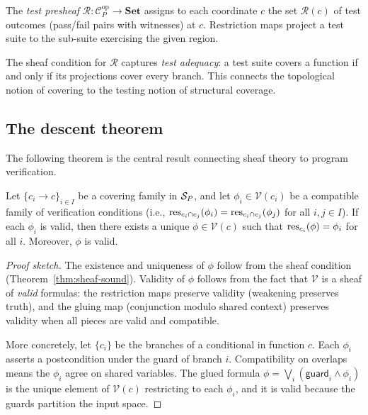\documentclass[11pt]{article}
\begin{document}
\begin{definition}
The \emph{test presheaf} $\mathcal{R} \colon \mathcal{C}_P^{\mathrm{op}} \to
\mathbf{Set}$ assigns to each coordinate $c$ the set $\mathcal{R}(c)$ of
test outcomes (pass/fail pairs with witnesses) at $c$.  Restriction maps
project a test suite to the sub-suite exercising the given region.
\end{definition}

The sheaf condition for $\mathcal{R}$ captures \emph{test adequacy}: a test
suite covers a function if and only if its projections cover every branch.
This connects the topological notion of covering to the testing notion of
structural coverage.

\subsection{The descent theorem}

The following theorem is the central result connecting sheaf theory to
program verification.

\begin{theorem}\label{thm:descent}
Let $\{c_i \to c\}_{i \in I}$ be a covering family in $\mathcal{S}_P$, and let
$\phi_i \in \mathcal{V}(c_i)$ be a compatible family of verification
conditions (i.e., $\mathrm{res}_{c_i \cap c_j}(\phi_i) = \mathrm{res}_{c_i \cap c_j}(\phi_j)$
for all $i, j \in I$).  If each $\phi_i$ is valid, then there exists a
unique $\phi \in \mathcal{V}(c)$ such that $\mathrm{res}_{c_i}(\phi) = \phi_i$
for all $i$.  Moreover, $\phi$ is valid.
\end{theorem}

\begin{proof}[Proof sketch]
The existence and uniqueness of $\phi$ follow from the sheaf condition
(Theorem~\ref{thm:sheaf-sound}).  Validity of $\phi$ follows from the fact
that $\mathcal{V}$ is a sheaf of \emph{valid} formulas: the restriction
maps preserve validity (weakening preserves truth), and the gluing map
(conjunction modulo shared context) preserves validity when all pieces are
valid and compatible.

More concretely, let $\{c_i\}$ be the branches of a conditional in function
$c$.  Each $\phi_i$ asserts a postcondition under the guard of branch $i$.
Compatibility on overlaps means the $\phi_i$ agree on shared variables.
The glued formula $\phi = \bigvee_i (\mathsf{guard}_i \wedge \phi_i)$ is the
unique element of $\mathcal{V}(c)$ restricting to each $\phi_i$, and it is
valid because the guards partition the input space.
\end{proof}
\end{document}
